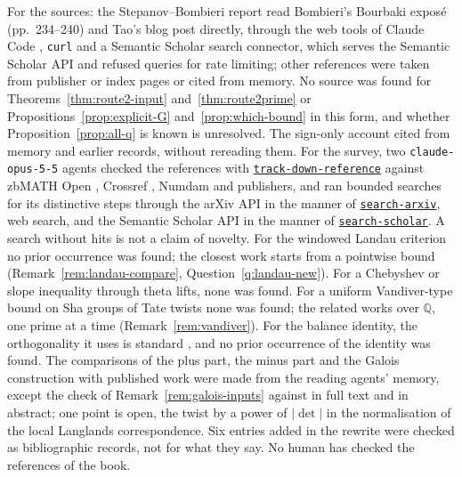 \documentclass[11pt]{amsbook}
\theoremstyle{plain}
\theoremstyle{definition}
\theoremstyle{remark}
\numberwithin{equation}{section}
\numberwithin{figure}{chapter}
\numberwithin{table}{chapter}
\newcommand{\Q}{\mathbb{Q}}
\newcommand{\vtwoskillurl}{https://github.com/tdupu/%
agent-skills-public/blob/8d13efb5e66306aeae6e3b948bc463e7e2db1b65}
\newcommand{\vtwoskill}[1]{%
\href{\vtwoskillurl/skills/#1/SKILL.md}{\texttt{#1}}}
\begin{document}
For the sources: the Stepanov--Bombieri report read Bombieri's
Bourbaki expos\'e \cite{Bombieri1974} (pp.~234--240) and Tao's blog
post \cite{Tao2014} directly, through the web tools of Claude Code
\cite[\href{https://code.claude.com/docs/en/tools-reference}%
{tools reference}]{ClaudeCodeTools}, \texttt{curl}
\cite[\href{https://curl.se/}{home page}]{curl} and a Semantic
Scholar search connector, which serves the Semantic Scholar API
\cite[\href{https://www.semanticscholar.org/product/api}%
{API page}]{SemanticScholarAPI} and refused queries for rate
limiting; other references were taken from publisher or index pages
or cited from memory. No source was found for
Theorems~\ref{thm:route2-input} and~\ref{thm:route2prime} or
Propositions~\ref{prop:explicit-G} and~\ref{prop:which-bound} in this
form, and whether Proposition~\ref{prop:all-q} is known is unresolved.
The sign-only account cited \cite{Katz2015,Poonen2004,Deligne1974}
from memory and earlier records, without rereading them. For the
survey, two \texttt{claude-opus-5-5} agents checked the references
with \vtwoskill{track-down-reference} against zbMATH Open
\cite[\href{https://zbmath.org/}{home page}]{zbMATHOpen}, Crossref
\cite[\href{https://www.crossref.org/documentation/retrieve-metadata/%
rest-api/}{REST API}]{Crossref}, Numdam
\cite[\href{https://www.numdam.org/}{home page}]{Numdam} and
publishers, and ran bounded searches for its distinctive steps through
the arXiv API \cite[\href{https://info.arxiv.org/help/api/index.html}%
{API page}]{arXivAPI} in the manner of \vtwoskill{search-arxiv}, web
search, and the Semantic Scholar API in the manner of
\vtwoskill{search-scholar}. A search without hits is not a claim of
novelty. For the windowed Landau criterion no prior occurrence was
found; the closest work \cite[Thm.~3.1]{BrouckeRevesz2026landau}
starts from a pointwise bound (Remark~\ref{rem:landau-compare},
Question~\ref{q:landau-new}). For a Chebyshev or slope inequality
through theta lifts, none was found. For a uniform Vandiver-type bound
on Sha groups of Tate twists none was found; the related
\cite[\S5, p.~232]{Kurihara1992} works over $\Q$, one prime at a time
(Remark~\ref{rem:vandiver}). For the balance identity, the
orthogonality it uses is standard
\cite[Cor.~4.2, Ex.~4.3]{Conrad2026characters}, and no prior occurrence
of the identity was found. The comparisons of the plus part, the minus
part and the Galois construction with published work were made from
the reading agents' memory, except the check of
Remark~\ref{rem:galois-inputs} against
\cite[Thm.~2.1.1]{BarnetLambGeeGeraghtyTaylor2014} in full text and
\cite{Caraiani2012,Caraiani2014} in abstract; one point is open, the
twist by a power of $|\det|$ in the normalisation of the local
Langlands correspondence. Six entries added in the rewrite
\cite{Kawamata1982,Viehweg1982,Nadel1990,Messing1972,%
AnschutzLeBras2023,Walfisz1936} were checked as bibliographic records,
not for what they say. No human has checked the references of the
book.
\end{document}
